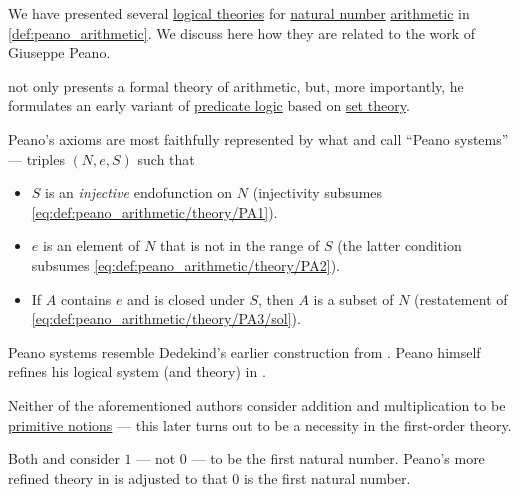 \begin{remark}\label{rem:peano_arithmetic}
  We have presented several \hyperref[def:logical_theory]{logical theories} for \hyperref[def:natural_numbers]{natural number} \hyperref[con:arithmetic]{arithmetic} in \cref{def:peano_arithmetic}. We discuss here how they are related to the work of Giuseppe Peano.

  \begin{thmenum}
     \Textcite[1]{Peano1889ArithmeticesPrincipia} not only presents a formal theory of arithmetic, but, more importantly, he formulates an early variant of \hyperref[con:predicate_logic]{predicate logic} based on \hyperref[def:axiomatic_set_theory]{set theory}.

    Peano's axioms are most faithfully represented by what \textcite[70]{Enderton1977SetTheory} and \textcite[53]{Mendelson2008NumberSystems} call \enquote{Peano systems} --- triples \( (N, e, S) \) such that
    \begin{itemize}
      \item \( S \) is an \emph{injective} endofunction on \( N \) (injectivity subsumes \eqref{eq:def:peano_arithmetic/theory/PA1}).

      \item \( e \) is an element of \( N \) that is not in the range of \( S \) (the latter condition subsumes \eqref{eq:def:peano_arithmetic/theory/PA2}).

      \item If \( A \) contains \( e \) and is closed under \( S \), then \( A \) is a subset of \( N \) (restatement of \eqref{eq:def:peano_arithmetic/theory/PA3/sol}).
    \end{itemize}

    Peano systems resemble Dedekind's earlier construction from \cite[def. 73]{Dedekind2007NatureAndMeaningOfNumbers}. Peano himself refines his logical system (and theory) in \cite[27]{Peano1908FormulatioMathematico}.

    Neither of the aforementioned authors consider addition and multiplication to be \hyperref[con:primitive_notion]{primitive notions} --- this later turns out to be a necessity in the first-order theory.

     Both \textcite[1]{Peano1889ArithmeticesPrincipia} and \textcite[def. 73]{Dedekind2007NatureAndMeaningOfNumbers} consider \( 1 \) --- not \( 0 \) --- to be the first natural number. Peano's more refined theory in \cite[27]{Peano1908FormulatioMathematico} is adjusted to that \( 0 \) is the first natural number.


\end{thmenum}
\end{remark}
